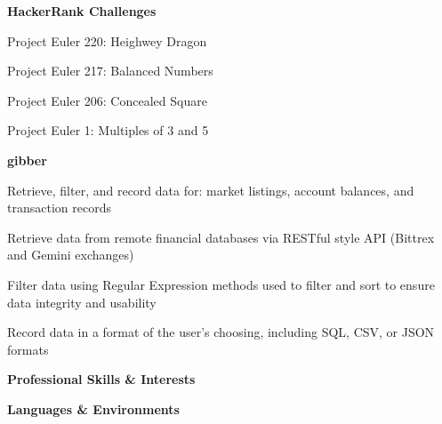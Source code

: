 \documentclass[letterpaper,final]{memoir}
\newcommand{\LargeSep}{\vspace{1.3em}}
\newcommand{\Sep}{\vspace{1.0em}}
\newcommand{\SmallSep}{\vspace{0.4em}}
\newcommand{\CVSection}[1]
	{\LARGE\textbf{#1}\par
	\SmallSep\normalsize}
\newcommand{\CVItem}[1]
	{\textbf{\color{Blue} #1}}
\begin{document}
\CVItem{HackerRank Challenges}
\SmallSep

\begin{multicols}{2}

    \begin{compactitem}[\color{Blue}$\circ$]

        
        \item Project Euler 220:    Heighwey Dragon
        
        \item Project Euler 217:    Balanced Numbers

        \item Project Euler 206:    Concealed Square

        \item Project Euler 1:      Multiples of 3 and 5

       
    \end{compactitem}

\end{multicols}

\Sep
\CVItem{gibber} 

\begin{compactitem}[\color{Blue}$\circ$]

    \SmallSep
    
    \item Retrieve, filter, and record data for: market listings, account balances, and transaction records
    
    \item Retrieve data from remote financial databases via RESTful style API (Bittrex and Gemini exchanges)
    
    \item Filter data using Regular Expression methods used to filter and sort to ensure data integrity and usability
    
    \item Record data in a format of the user's choosing, including SQL, CSV, or JSON formats
    
\end{compactitem}
\LargeSep


\notoserif \CVSection{Professional Skills \& Interests}
\normalfont
\SmallSep

\CVItem{Languages \& Environments}
\Sep
\end{document}
